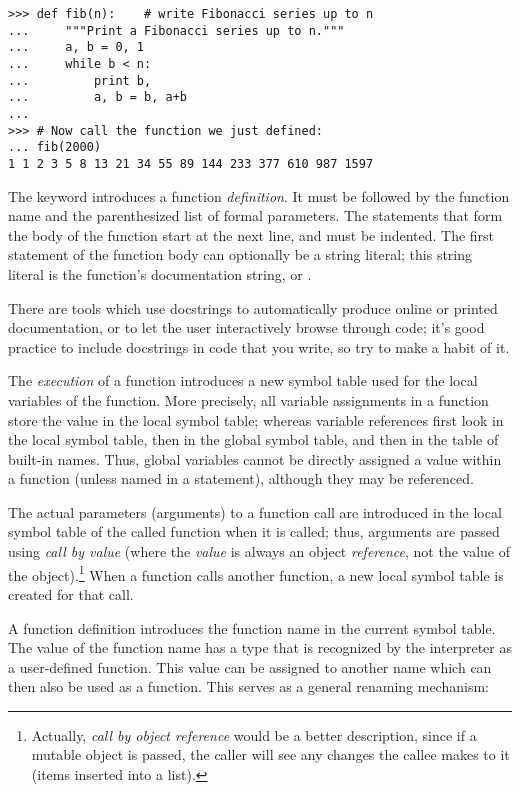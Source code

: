 \documentclass{manual}
\begin{document}
\begin{verbatim}
>>> def fib(n):    # write Fibonacci series up to n
...     """Print a Fibonacci series up to n."""
...     a, b = 0, 1
...     while b < n:
...         print b,
...         a, b = b, a+b
... 
>>> # Now call the function we just defined:
... fib(2000)
1 1 2 3 5 8 13 21 34 55 89 144 233 377 610 987 1597
\end{verbatim}

The keyword  introduces a function \emph{definition}.  It
must be followed by the function name and the parenthesized list of
formal parameters.  The statements that form the body of the function
start at the next line, and must be indented.  The first statement of
the function body can optionally be a string literal; this string
literal is the function's documentation
string, or .

There are tools which use docstrings to automatically produce online
or printed documentation, or to let the user interactively browse
through code; it's good practice to include docstrings in code that
you write, so try to make a habit of it.

The \emph{execution} of a function introduces a new symbol table used
for the local variables of the function.  More precisely, all variable
assignments in a function store the value in the local symbol table;
whereas variable references first look in the local symbol table, then
in the global symbol table, and then in the table of built-in names.
Thus,  global variables cannot be directly assigned a value within a
function (unless named in a  statement), although
they may be referenced.

The actual parameters (arguments) to a function call are introduced in
the local symbol table of the called function when it is called; thus,
arguments are passed using \emph{call by value} (where the
\emph{value} is always an object \emph{reference}, not the value of
the object).\footnote{
         Actually, \emph{call by object reference} would be a better
         description, since if a mutable object is passed, the caller
         will see any changes the callee makes to it (items
         inserted into a list).
} When a function calls another function, a new local symbol table is
created for that call.

A function definition introduces the function name in the current
symbol table.  The value of the function name
has a type that is recognized by the interpreter as a user-defined
function.  This value can be assigned to another name which can then
also be used as a function.  This serves as a general renaming
mechanism:
\end{document}
